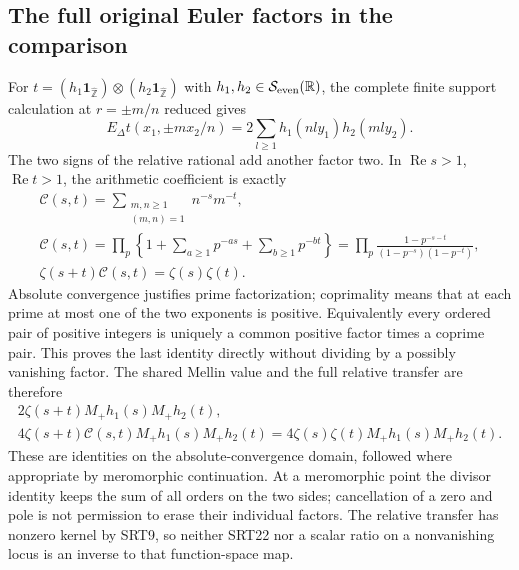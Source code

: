 \subsection{The full original Euler factors in the comparison}
For $t=(h_1\mathbf1_{\widehat{\mathbb Z}})\otimes
(h_2\mathbf1_{\widehat{\mathbb Z}})$ with
$h_1,h_2\in\mathcal S_{\rm even}(\mathbb R)$, the complete finite support
calculation at $r=\pm m/n$ reduced gives
\begin{equation}\tag{SRT21}
E_\Delta t(x_1,\pm m x_2/n)
 =2\sum_{l\ge1}h_1(nl y_1)h_2(ml y_2).
\end{equation}
The two signs of the relative rational add another factor two.
In $\operatorname{Re}s>1$, $\operatorname{Re}t>1$, the arithmetic
coefficient is exactly
\begin{equation}\tag{SRT22}
\begin{gathered}
\mathcal C(s,t)=\sum_{\substack{m,n\ge1\\(m,n)=1}}n^{-s}m^{-t},\\
\mathcal C(s,t)=\prod_p\left\{1+
       \sum_{a\ge1}p^{-as}+\sum_{b\ge1}p^{-bt}\right\}
 =\prod_p\frac{1-p^{-s-t}}{(1-p^{-s})(1-p^{-t})},\\
\zeta(s+t)\mathcal C(s,t)=\zeta(s)\zeta(t).
\end{gathered}
\end{equation}
Absolute convergence justifies prime factorization; coprimality
means that at each prime at most one of the two exponents is positive.
Equivalently every ordered pair of positive integers is uniquely a
common positive factor times a coprime pair. This proves the last
identity directly without dividing by a possibly vanishing factor.
The shared Mellin value and the full relative transfer are therefore
\begin{equation}\tag{SRT23}
\begin{gathered}
2\zeta(s+t)M_+h_1(s)M_+h_2(t),\\
4\zeta(s+t)\mathcal C(s,t)M_+h_1(s)M_+h_2(t)
 =4\zeta(s)\zeta(t)M_+h_1(s)M_+h_2(t).
\end{gathered}
\end{equation}
These are identities on the absolute-convergence domain, followed
where appropriate by meromorphic continuation. At a meromorphic
point the divisor identity keeps the sum of all orders on the two
sides; cancellation of a zero and pole is not permission to erase
their individual factors. The relative transfer has nonzero kernel
by SRT9, so neither SRT22 nor a scalar ratio on a nonvanishing locus
is an inverse to that function-space map.


